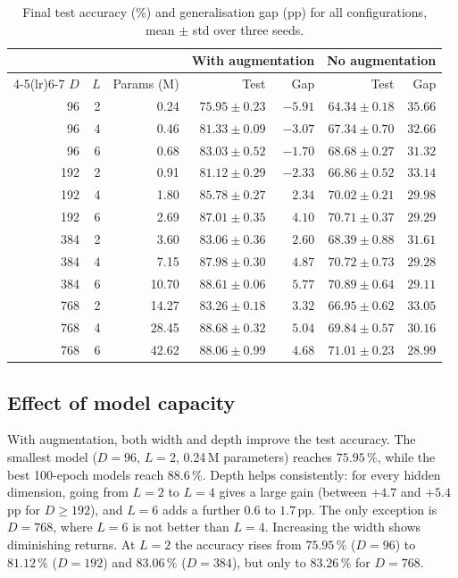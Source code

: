 \begin{table}[H]
\centering
\small
\setlength{\tabcolsep}{4pt}
\caption{Final test accuracy (\%) and generalisation gap (pp) for all configurations, mean $\pm$ std over three seeds.}
\label{tab:results}
\begin{tabular}{rrr rr rr}
\toprule
 & & & \multicolumn{2}{c}{With augmentation} & \multicolumn{2}{c}{No augmentation} \\
\cmidrule(lr){4-5}\cmidrule(lr){6-7}
$D$ & $L$ & Params (M) & Test & Gap & Test & Gap \\
\midrule
 96 & 2 &  0.24 & $75.95 \pm 0.23$ & $-5.91$ & $64.34 \pm 0.18$ & $35.66$ \\
 96 & 4 &  0.46 & $81.33 \pm 0.09$ & $-3.07$ & $67.34 \pm 0.70$ & $32.66$ \\
 96 & 6 &  0.68 & $83.03 \pm 0.52$ & $-1.70$ & $68.68 \pm 0.27$ & $31.32$ \\
192 & 2 &  0.91 & $81.12 \pm 0.29$ & $-2.33$ & $66.86 \pm 0.52$ & $33.14$ \\
192 & 4 &  1.80 & $85.78 \pm 0.27$ & $2.34$  & $70.02 \pm 0.21$ & $29.98$ \\
192 & 6 &  2.69 & $87.01 \pm 0.35$ & $4.10$  & $70.71 \pm 0.37$ & $29.29$ \\
384 & 2 &  3.60 & $83.06 \pm 0.36$ & $2.60$  & $68.39 \pm 0.88$ & $31.61$ \\
384 & 4 &  7.15 & $87.98 \pm 0.30$ & $4.87$  & $70.72 \pm 0.73$ & $29.28$ \\
384 & 6 & 10.70 & $88.61 \pm 0.06$ & $5.77$  & $70.89 \pm 0.64$ & $29.11$ \\
768 & 2 & 14.27 & $83.26 \pm 0.18$ & $3.32$  & $66.95 \pm 0.62$ & $33.05$ \\
768 & 4 & 28.45 & $88.68 \pm 0.32$ & $5.04$  & $69.84 \pm 0.57$ & $30.16$ \\
768 & 6 & 42.62 & $88.06 \pm 0.99$ & $4.68$  & $71.01 \pm 0.23$ & $28.99$ \\
\bottomrule
\end{tabular}
\end{table}

\subsection{Effect of model capacity}

With augmentation, both width and depth improve the test accuracy. The smallest model ($D=96$, $L=2$, 0.24\,M parameters) reaches $75.95\,\%$, while the best 100-epoch models reach $88.6\,\%$. Depth helps consistently: for every hidden dimension, going from $L=2$ to $L=4$ gives a large gain (between $+4.7$ and $+5.4$\,pp for $D\geq192$), and $L=6$ adds a further $0.6$ to $1.7$\,pp. The only exception is $D=768$, where $L=6$ is not better than $L=4$. Increasing the width shows diminishing returns. At $L=2$ the accuracy rises from $75.95\,\%$ ($D=96$) to $81.12\,\%$ ($D=192$) and $83.06\,\%$ ($D=384$), but only to $83.26\,\%$ for $D=768$.

